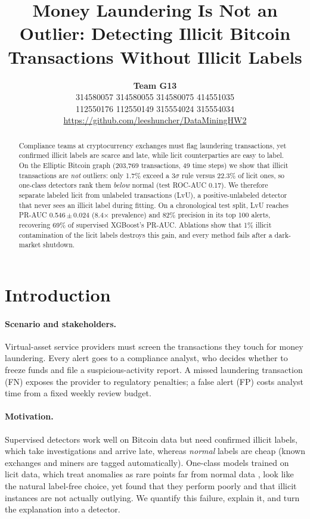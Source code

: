 \documentclass[11pt]{article}
\title{Money Laundering Is Not an Outlier: Detecting Illicit Bitcoin Transactions Without Illicit Labels}
\author{
  \textbf{Team G13} \\
  \zh{李尚哲} 314580057 \quad \zh{呂丞頤} 314580055 \quad \zh{黃駿甯} 314580075 \quad \zh{吳美真} 414551035 \\
  \zh{孫傅康} 112550176 \quad \zh{傅維雨} 112550149 \quad \zh{張凱華} 315554024 \quad \zh{李玠廷} 315554034 \\
  \url{https://github.com/leeshuncher/DataMiningHW2}
}
\newcommand{\ours}{LvU}
\begin{document}
\maketitle

\begin{abstract}
Compliance teams at cryptocurrency exchanges must flag laundering transactions, yet confirmed illicit labels are scarce and late, while licit counterparties are easy to label.
On the Elliptic Bitcoin graph (203,769 transactions, 49 time steps) we show that illicit transactions are \emph{not} outliers: only 1.7\% exceed a 3$\sigma$ rule versus 22.3\% of licit ones, so one-class detectors rank them \emph{below} normal (test ROC-AUC 0.17).
We therefore separate labeled licit from unlabeled transactions (\ours{}), a positive-unlabeled detector that never sees an illicit label during fitting.
On a chronological test split, \ours{} reaches PR-AUC 0.546\,$\pm$\,0.024 (8.4$\times$ prevalence) and 82\% precision in its top 100 alerts, recovering 69\% of supervised XGBoost's PR-AUC.
Ablations show that 1\% illicit contamination of the licit labels destroys this gain, and every method fails after a dark-market shutdown.
\end{abstract}

\section{Introduction}

\paragraph{Scenario and stakeholders.}
Virtual-asset service providers must screen the transactions they touch for money laundering.
Every alert goes to a compliance analyst, who decides whether to freeze funds and file a suspicious-activity report.
A missed laundering transaction (FN) exposes the provider to regulatory penalties; a false alert (FP) costs analyst time from a fixed weekly review budget.

\paragraph{Motivation.}
Supervised detectors work well on Bitcoin data \citep{weber2019aml} but need confirmed illicit labels, which take investigations and arrive late, whereas \emph{normal} labels are cheap (known exchanges and miners are tagged automatically).
One-class models trained on licit data, which treat anomalies as rare points far from normal data \citep{chandola2009survey}, look like the natural label-free choice, yet \citet{lorenz2020label} found that they perform poorly and that illicit instances are not actually outlying.
We quantify this failure, explain it, and turn the explanation into a detector.
\end{document}
